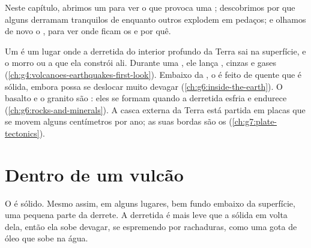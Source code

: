 Neste capítulo, abrimos um  para ver o que provoca uma ;
descobrimos por que alguns  derramam  tranquilos de  enquanto
outros explodem em pedaços; e olhamos de novo o , para ver onde
ficam os  e por quê.

\begin{recall}
Um \emph{} é um lugar onde a  derretida do interior profundo da
Terra sai na superfície, e o morro ou a  que ela constrói ali.
Durante uma \emph{}, ele lança , cinzas e gases
(\cref{ch:g4:volcanoes-earthquakes-first-look}). Embaixo da , o 
é feito de  quente que é sólida, embora possa se deslocar muito
devagar (\cref{ch:g6:inside-the-earth}). O basalto e o granito são : eles se formam quando a  derretida esfria e endurece
(\cref{ch:g6:rocks-and-minerals}). A casca externa da Terra está partida
em placas que se movem alguns centímetros por ano; as suas bordas são os
 (\cref{ch:g7:plate-tectonics}).
\end{recall}

\section{Dentro de um vulcão}

O  é sólido. Mesmo assim, em alguns lugares, bem fundo embaixo da
superfície, uma pequena parte da  derrete. A  derretida é mais
leve que a  sólida em volta dela, então ela sobe devagar, se
espremendo por rachaduras, como uma gota de óleo que sobe na água.


